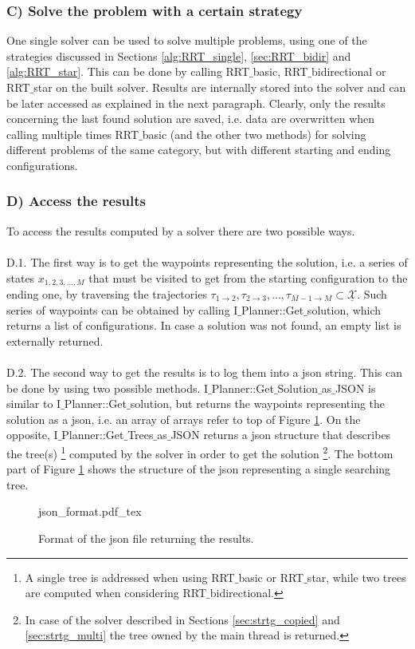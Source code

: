 \subsubsection{C) Solve the problem with a certain strategy}

One single solver can be used to solve multiple problems, using one of the strategies discussed in Sections \ref{alg:RRT_single}, \ref{sec:RRT_bidir} and \ref{alg:RRT_star}. This can be done by calling RRT$\_$basic, RRT$\_$bidirectional or RRT$\_$star on the built solver.
Results are internally stored into the solver and can be later accessed as explained in the next paragraph. Clearly, only the results concerning the last found solution are saved, i.e. data are overwritten when calling multiple times RRT$\_$basic (and the other two methods) for solving different problems of the same category, but with different starting and ending configurations.

\subsubsection{D) Access the results}

To access the results computed by a solver there are two possible ways.
\\
\\
D.1. The first way is to get the waypoints representing the solution, i.e. a series of states $x_{1,2,3,\hdots,M}$ that must be visited to get from the starting configuration to the ending one, by traversing the trajectories $\tau_{1 \rightarrow 2 } , \tau_{2 \rightarrow 3}, \hdots ,\tau_{M-1 \rightarrow M} \subset \underline{\mathcal{X}}$. Such series of waypoints can be obtained by calling I$\_$Planner::Get$\_$solution, which returns a list of configurations. In case a solution was not found, an empty list is externally returned.
\\
\\
D.2. The second way to get the results is to log them into a json string. This can be done by using two possible methods.
I$\_$Planner::Get$\_$Solution$\_$as$\_$JSON is similar to I$\_$Planner::Get$\_$solution, but returns the waypoints representing the solution as a json, i.e. an array of arrays refer to top of Figure \ref{fig:json_format}. On the opposite, I$\_$Planner::Get$\_$Trees$\_$as$\_$JSON returns a json structure that describes the tree(s) \footnote{A single tree is addressed when using RRT$\_$basic or RRT$\_$star, while two trees are computed when considering RRT$\_$bidirectional.} computed by the solver in order to get the solution \footnote{In case of the solver described in Sections \ref{sec:strtg_copied} and \ref{sec:strtg_multi} the tree owned by the main thread is returned. }. The bottom part of Figure \ref{fig:json_format} shows the structure of the json representing a single searching tree.

 \begin{figure}
	 \centering
 \def\svgwidth{0.85 \columnwidth}
 {json_format.pdf_tex} 
	 \caption{Format of the json file returning the results.}
 \label{fig:json_format}
 \end{figure}



